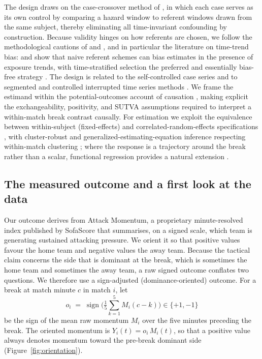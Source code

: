 \documentclass[11pt]{article}
\begin{document}
The design draws on the case-crossover method of \citet{maclure1991casecrossover}, in which each case serves
as its own control by comparing a hazard window to referent windows drawn from the same subject, thereby
eliminating all time-invariant confounding by construction. Because validity hinges on how referents are
chosen, we follow the methodological cautions of \citet{mittleman1995control} and
\citet{marshall1993casecrossover}, and in particular the literature on time-trend bias:
\citet{lumley2000bias} and \citet{janes2005referent} show that naive referent schemes can bias estimates in
the presence of exposure trends, with time-stratified selection the preferred and essentially bias-free
strategy \citep{mittleman2005settled}. The design is related to the self-controlled case series
\citep{farrington1995sccs,whitaker2006sccs} and to segmented and controlled interrupted time series methods
\citep{wagner2002segmented,lopezbernal2017its,lopezbernal2018controls}. We frame the estimand within the
potential-outcomes account of causation \citep{rubin1974causal,holland1986causal,hernan2020whatif}, making
explicit the exchangeability, positivity, and SUTVA assumptions required to interpret a within-match break
contrast causally. For estimation we exploit the equivalence between within-subject (fixed-effects) and
correlated-random-effects specifications \citep{mundlak1978pooling}, with cluster-robust and
generalized-estimating-equation inference respecting within-match clustering
\citep{liang1986gee,cameron2015cluster}; where the response is a trajectory around the break rather than a
scalar, functional regression provides a natural extension \citep{morris2015functional,goldsmith2011penalized}.

\subsection{The measured outcome and a first look at the data}

Our outcome derives from Attack Momentum, a proprietary minute-resolved index published by SofaScore
\citep{sofascore2026} that
summarises, on a signed scale, which team is generating sustained attacking pressure. We orient it so that
positive values favour the home team and negative values the away team. Because the tactical claim concerns
the side that is dominant at the break, which is sometimes the home team and sometimes the away team, a raw
signed outcome conflates two questions. We therefore use a sign-adjusted (dominance-oriented) outcome. For a
break at match minute $c$ in match $i$, let
\begin{equation}
o_i \;=\; \operatorname{sign}\!\Big(\tfrac{1}{5}\textstyle\sum_{k=1}^{5} M_i(c-k)\Big) \in\{+1,-1\}
\end{equation}
be the sign of the mean raw momentum $M_i$ over the five minutes preceding the break. The oriented momentum is
$Y_i(t)=o_i\,M_i(t)$, so that a positive value always denotes momentum toward the pre-break dominant side
(Figure~\ref{fig:orientation}).
\end{document}
